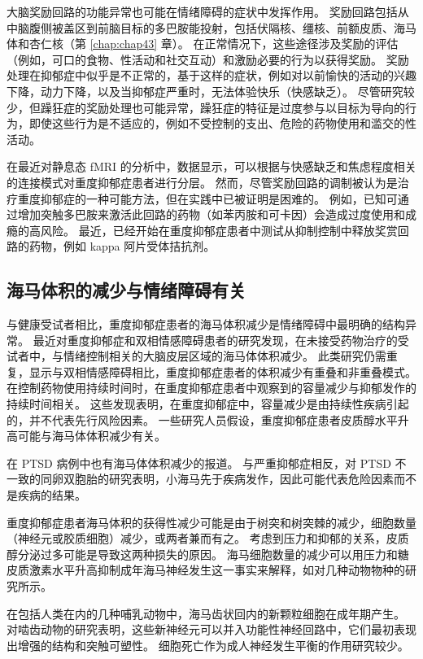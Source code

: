大脑奖励回路的功能异常也可能在情绪障碍的症状中发挥作用。
奖励回路包括从中脑腹侧被盖区到前脑目标的多巴胺能投射，包括伏隔核、缰核、前额皮质、海马体和杏仁核（第 \ref{chap:chap43} 章）。
在正常情况下，这些途径涉及奖励的评估（例如，可口的食物、性活动和社交互动）和激励必要的行为以获得奖励。
奖励处理在抑郁症中似乎是不正常的，基于这样的症状，例如对以前愉快的活动的兴趣下降，动力下降，以及当抑郁症严重时，无法体验快乐（快感缺乏）。
尽管研究较少，但躁狂症的奖励处理也可能异常，躁狂症的特征是过度参与以目标为导向的行为，即使这些行为是不适应的，例如不受控制的支出、危险的药物使用和滥交的性活动。


在最近对静息态 fMRI 的分析中，数据显示，可以根据与快感缺乏和焦虑程度相关的连接模式对重度抑郁症患者进行分层。
然而，尽管奖励回路的调制被认为是治疗重度抑郁症的一种可能方法，但在实践中已被证明是困难的。
例如，已知可通过增加突触多巴胺来激活此回路的药物（如苯丙胺和可卡因）会造成过度使用和成瘾的高风险。
最近，已经开始在重度抑郁症患者中测试从抑制控制中释放奖赏回路的药物，例如 kappa 阿片受体拮抗剂。



\subsection{海马体积的减少与情绪障碍有关}

与健康受试者相比，重度抑郁症患者的海马体积减少是情绪障碍中最明确的结构异常。
最近对重度抑郁症和双相情感障碍患者的研究发现，在未接受药物治疗的受试者中，与情绪控制相关的大脑皮层区域的海马体体积减少。
此类研究仍需重复，显示与双相情感障碍相比，重度抑郁症患者的体积减少有重叠和非重叠模式。
在控制药物使用持续时间时，在重度抑郁症患者中观察到的容量减少与抑郁发作的持续时间相关。
这些发现表明，在重度抑郁症中，容量减少是由持续性疾病引起的，并不代表先行风险因素。
一些研究人员假设，重度抑郁症患者皮质醇水平升高可能与海马体体积减少有关。


在 PTSD 病例中也有海马体体积减少的报道。
与严重抑郁症相反，对 PTSD 不一致的同卵双胞胎的研究表明，小海马先于疾病发作，因此可能代表危险因素而不是疾病的结果。


重度抑郁症患者海马体积的获得性减少可能是由于树突和树突棘的减少，细胞数量（神经元或胶质细胞）减少，或两者兼而有之。
考虑到压力和抑郁的关系，皮质醇分泌过多可能是导致这两种损失的原因。
海马细胞数量的减少可以用压力和糖皮质激素水平升高抑制成年海马神经发生这一事实来解释，如对几种动物物种的研究所示。


在包括人类在内的几种哺乳动物中，海马齿状回内的新颗粒细胞在成年期产生。
对啮齿动物的研究表明，这些新神经元可以并入功能性神经回路中，它们最初表现出增强的结构和突触可塑性。
细胞死亡作为成人神经发生平衡的作用研究较少。



